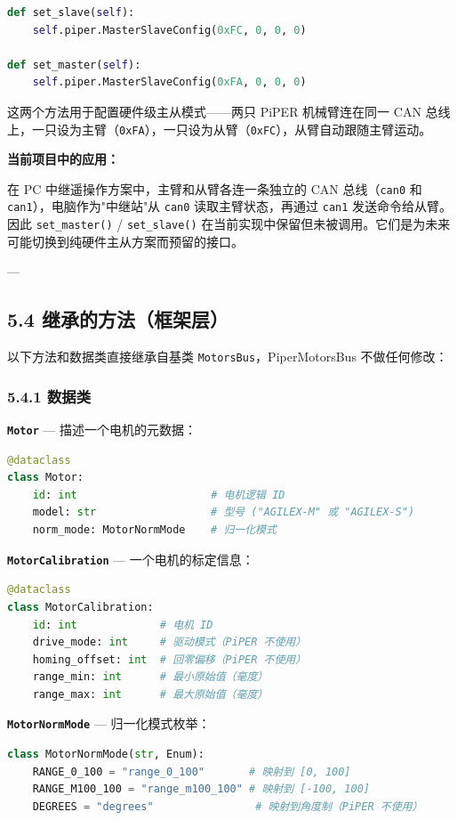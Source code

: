 \documentclass[UTF8,a4paper,11pt]{ctexart}
\begin{document}
{\begin{lstlisting}[language=python]
def set_slave(self):
    self.piper.MasterSlaveConfig(0xFC, 0, 0, 0)

def set_master(self):
    self.piper.MasterSlaveConfig(0xFA, 0, 0, 0)
\end{lstlisting}

这两个方法用于配置硬件级主从模式——两只 PiPER 机械臂连在同一 CAN 总线上，一只设为主臂（\texttt{0xFA}），一只设为从臂（\texttt{0xFC}），从臂自动跟随主臂运动。

\textbf{当前项目中的应用：}

在 PC 中继遥操作方案中，主臂和从臂各连一条独立的 CAN 总线（\texttt{can0} 和 \texttt{can1}），电脑作为"中继站"从 \texttt{can0} 读取主臂状态，再通过 \texttt{can1} 发送命令给从臂。因此 \texttt{set_master()} / \texttt{set_slave()} 在当前实现中保留但未被调用。它们是为未来可能切换到纯硬件主从方案而预留的接口。

---

\subsection{5.4 继承的方法（框架层）}

以下方法和数据类直接继承自基类 \texttt{MotorsBus}，PiperMotorsBus 不做任何修改：

\subsubsection{5.4.1 数据类}

\textbf{\texttt{Motor}} — 描述一个电机的元数据：
\begin{lstlisting}[language=python]
@dataclass
class Motor:
    id: int                     # 电机逻辑 ID
    model: str                  # 型号 ("AGILEX-M" 或 "AGILEX-S")
    norm_mode: MotorNormMode    # 归一化模式
\end{lstlisting}

\textbf{\texttt{MotorCalibration}} — 一个电机的标定信息：
\begin{lstlisting}[language=python]
@dataclass
class MotorCalibration:
    id: int             # 电机 ID
    drive_mode: int     # 驱动模式（PiPER 不使用）
    homing_offset: int  # 回零偏移（PiPER 不使用）
    range_min: int      # 最小原始值（毫度）
    range_max: int      # 最大原始值（毫度）
\end{lstlisting}

\textbf{\texttt{MotorNormMode}} — 归一化模式枚举：
\begin{lstlisting}[language=python]
class MotorNormMode(str, Enum):
    RANGE_0_100 = "range_0_100"       # 映射到 [0, 100]
    RANGE_M100_100 = "range_m100_100" # 映射到 [-100, 100]
    DEGREES = "degrees"                # 映射到角度制（PiPER 不使用）
\end{lstlisting}

}
\end{document}
